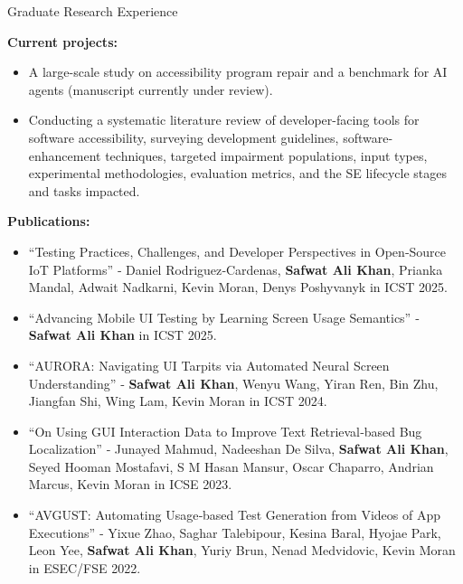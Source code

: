 \documentclass{resume} %
\begin{document}
\begin{rSection}{Graduate Research Experience}
\item{\bf Current projects:}
\begin{itemize}
\item A large-scale study on accessibility program repair and a benchmark for AI agents (manuscript currently under review).
\item Conducting a systematic literature review of developer-facing tools for software accessibility, surveying development guidelines, software-enhancement techniques, targeted impairment populations, input types, experimental methodologies, evaluation metrics, and the SE lifecycle stages and tasks impacted.
\end{itemize}

\item {\bf Publications:}
    \begin{itemize}
        \item ``Testing Practices, Challenges, and Developer Perspectives in Open‑Source IoT Platforms'' ‑ Daniel Rodriguez‑Cardenas, \textbf{Safwat Ali Khan}, Prianka Mandal, Adwait Nadkarni, Kevin Moran, Denys Poshyvanyk in ICST 2025.
        \item ``Advancing Mobile UI Testing by Learning Screen Usage Semantics'' ‑ \textbf{Safwat Ali Khan} in ICST 2025.
        \item ``AURORA: Navigating UI Tarpits via Automated Neural Screen Understanding'' ‑ \textbf{Safwat Ali Khan}, Wenyu Wang, Yiran Ren, Bin Zhu, Jiangfan Shi, Wing Lam, Kevin Moran in ICST 2024.
        \item ``On Using GUI Interaction Data to Improve Text Retrieval‑based Bug Localization'' ‑ Junayed Mahmud, Nadeeshan De Silva, \textbf{Safwat Ali Khan}, Seyed Hooman Mostafavi, S M Hasan Mansur, Oscar Chaparro, Andrian Marcus, Kevin Moran in ICSE 2023.
        \item ``AVGUST: Automating Usage‑based Test Generation from Videos of App Executions'' ‑ Yixue Zhao, Saghar Talebipour, Kesina Baral, Hyojae Park, Leon Yee, \textbf{Safwat Ali Khan}, Yuriy Brun, Nenad Medvidovic, Kevin Moran in ESEC/FSE 2022.
    \end{itemize}
\end{rSection}
\end{document}
